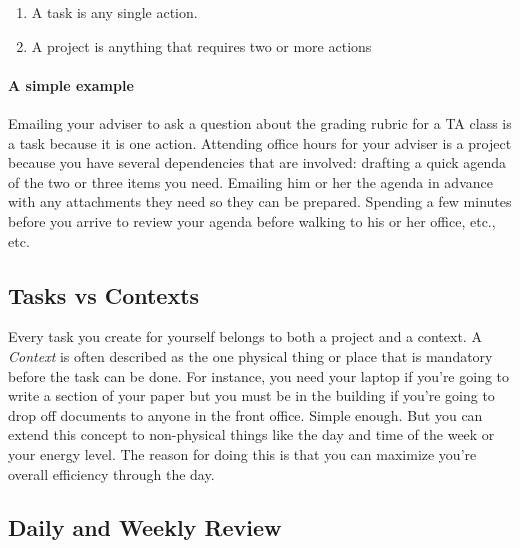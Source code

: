 \documentclass{tufte-handout}
\begin{document}
\begin{enumerate}
\item[] A task is any single action.
\item[] A project is anything that requires two or more actions
\end{enumerate}

\paragraph{A simple example}

Emailing your adviser to ask a question about the grading rubric for a
TA class is a task because it is one action. Attending office hours
for your adviser is a project because you have several dependencies
that are involved: drafting a quick agenda of the two or three items
you need. Emailing him or her the agenda in advance with any
attachments they need so they can be prepared. Spending a few minutes
before you arrive to review your agenda before walking to his or her
office, etc., etc. 


\subsection{Tasks vs Contexts}
\label{tasks-contexts}

Every task you create for yourself belongs to both a project and a
context. A \textit{Context} is often described as
the one physical thing or place that is mandatory before the task can
be done. For instance, you need your laptop if you're going to write a
section of your paper but you must be in the building if you're going to drop
off documents to anyone in the front office. Simple enough. But you
can extend this concept to non-physical things like the day and time
of the week or your energy level. The reason for doing this is that
you can maximize you're overall efficiency through the day.

\subsection{Daily and Weekly Review}
\label{sec:review}
\end{document}
